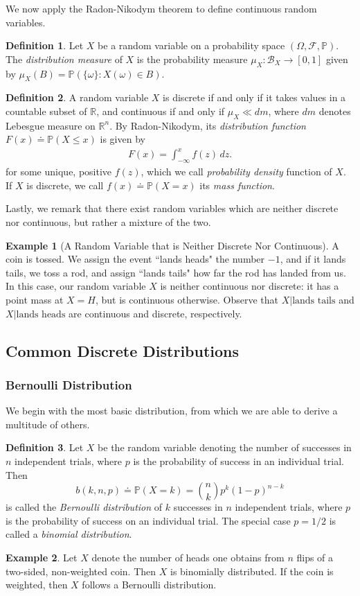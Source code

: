 \documentclass[12pt]{article}
\newcommand{\rr}{\mathbb{R}}
\newcommand{\filter}{\mathcal{F}}
\newcommand{\borel}{\mathcal{B}}
\newcommand{\prob}{\mathbb{P}}
\theoremstyle{plain}
\theoremstyle{definition}
\newtheorem*{definition}{Definition}
\newtheorem*{example}{Example}
\theoremstyle{remark}
\numberwithin{equation}{section}  %
\begin{document}
We now apply the Radon-Nikodym theorem to define continuous random variables.
\begin{definition}
Let $X$ be a random variable on a probability space $(\Omega, \filter, \prob)$. 
The \emph{distribution measure} of $X$ is the probability measure $\mu_X:
\borel_X \to [0,1]$ given by $\mu_X(B) = \prob(\{\omega\}: X(\omega) \in B)$.
\end{definition}
\begin{definition}
A random variable $X$ is discrete if and only if it takes values in a countable
subset of $\rr$, and continuous if and only if $\mu_X \ll dm$, where $dm$
denotes Lebesgue measure on $\rr^n$. By Radon-Nikodym, its \emph{distribution
function} $F(x) \doteq \prob(X \le x)$ is given by
\begin{align*}
F(x) = \int_{-\infty}^x f(z) \,dz.
\end{align*}
for some unique, positive $f(z)$, which we call \emph{probability density}
function of $X$.
If $X$ is discrete, we call
$f(x) \doteq \prob(X = x)$ its \emph{mass function}.
\end{definition}
Lastly, we remark that there exist random variables which are neither
discrete nor continuous, but rather a mixture of the two.
\begin{example}[A Random Variable that is Neither Discrete Nor Continuous]
A coin is tossed. We assign the event ``lands heads" the number $-1$, and 
if it lands tails, we toss a rod, and assign ``lands tails" how far the rod has
landed from us. In this case, our random variable $X$ is neither continuous nor
discrete: it has a point mass at $X = H$, but is continuous otherwise.
Observe that $X | \text{lands tails}$ and $X | \text{lands heads}$ are
continuous and discrete, respectively.
\end{example}
\subsection{Common Discrete Distributions}
\subsubsection{Bernoulli Distribution}
We begin with the most basic distribution, from which
we are able to derive a multitude of others.
\begin{definition}
Let $X$ be the random variable denoting the number of successes
in $n$ independent trials, where $p$ is the probability of success in
an individual trial. Then
\begin{equation*}
b(k, n, p) \doteq \mathbb{P}(X = k) = \binom{n}{k} p^k (1 - p)^{n-k}
\end{equation*}
is called the \emph{Bernoulli distribution} of $k$ successes
in $n$ independent trials, where $p$ is the probability of success on an
individual trial. The special case
$p = 1/2$ is called a \emph{binomial distribution}.
\end{definition}
\begin{example}
Let $X$ denote the number of heads one obtains from $n$ flips of a
two-sided, non-weighted coin. Then $X$ is binomially distributed.
If the coin is weighted, then $X$ follows a Bernoulli distribution.
\end{example}
\end{document}
